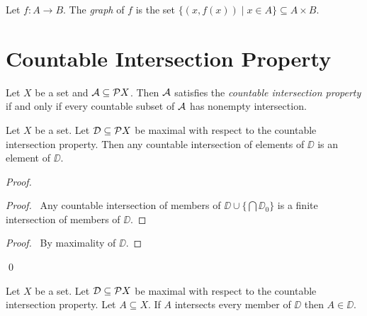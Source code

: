 \begin{definition}[Graph]
    Let $f : A \rightarrow B$. The \emph{graph} of $f$ is the set $\{ (x, f(x)) \mid x \in A \} \subseteq A \times B$.
\end{definition}

\section{Countable Intersection Property}

\begin{definition}
    Let $X$ be a set and $\AA \subseteq \pow X$. Then $\AA$ satisfies the \emph{countable intersection property}
    if and only if every countable subset of $\AA$ has nonempty intersection.
\end{definition}

\begin{lemma}
    \label{lemma:countable_intersection_maximal}
    Let $X$ be a set. Let $\DD \subseteq \pow X$ be maximal with respect to the countable intersection property.
    Then any countable intersection of elements of $\DD$ is an element of $\DD$.
\end{lemma}

\begin{proof}
    \pf
    \begin{proof}
        \pf\ Any countable intersection of members of $\DD \cup \{ \bigcap \DD_0 \}$
        is a finite intersection of members of $\DD$.
    \end{proof}
    \begin{proof}
        \pf\ By maximality of $\DD$.
    \end{proof}
    \qed
\end{proof}

\begin{lemma}
    Let $X$ be a set. Let $\DD \subseteq \pow X$ be maximal with respect to the countable intersection property.
    Let $A \subseteq X$. If $A$ intersects every member of $\DD$ then $A \in \DD$.
\end{lemma}

